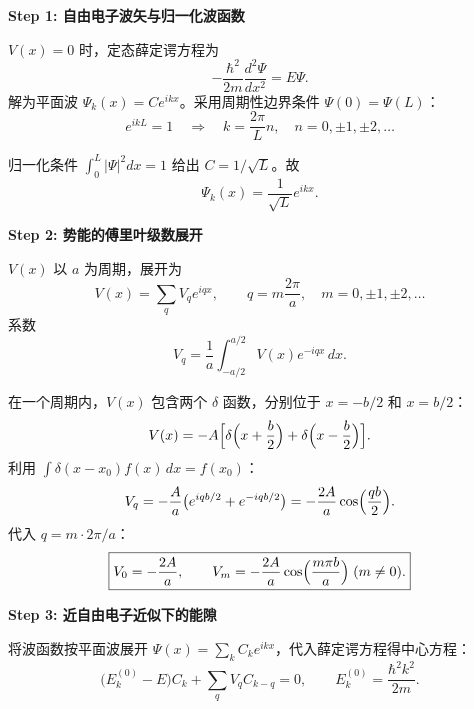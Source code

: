 \begin{derivationbox}[标准解题过程]
\textbf{Step 1: 自由电子波矢与归一化波函数}

$V(x)=0$ 时，定态薛定谔方程为
\begin{equation}
-\frac{\hbar^2}{2m}\frac{d^2\Psi}{dx^2}=E\Psi.
\end{equation}
解为平面波 $\Psi_k(x)=Ce^{ikx}$。采用周期性边界条件 $\Psi(0)=\Psi(L)$：
\begin{equation}
e^{ikL}=1\quad\Longrightarrow\quad k=\frac{2\pi}{L}n,\quad n=0,\pm1,\pm2,\ldots
\end{equation}

归一化条件 $\int_0^L|\Psi|^2dx=1$ 给出 $C=1/\sqrt{L}$。故
\begin{equation}
\boxed{\Psi_k(x)=\frac{1}{\sqrt{L}}e^{ikx}.}
\end{equation}

\textbf{Step 2: 势能的傅里叶级数展开}

$V(x)$ 以 $a$ 为周期，展开为
\begin{equation}
V(x)=\sum_{q}V_q e^{iqx},\qquad q=m\frac{2\pi}{a},\quad m=0,\pm1,\pm2,\ldots
\end{equation}
系数
\begin{equation}
V_q=\frac{1}{a}\int_{-a/2}^{a/2}V(x)e^{-iqx}\,dx.
\end{equation}

在一个周期内，$V(x)$ 包含两个 $\delta$ 函数，分别位于 $x=-b/2$ 和 $x=b/2$：
\begin{equation}
V(x)=-A\Bigl[\delta\Bigl(x+\frac{b}{2}\Bigr)+\delta\Bigl(x-\frac{b}{2}\Bigr)\Bigr].
\end{equation}
利用 $\int\delta(x-x_0)f(x)\,dx=f(x_0)$：
\begin{equation}
V_q=-\frac{A}{a}\bigl(e^{iqb/2}+e^{-iqb/2}\bigr)=-\frac{2A}{a}\cos\Bigl(\frac{qb}{2}\Bigr).
\end{equation}
代入 $q=m\cdot2\pi/a$：
\begin{equation}
\boxed{V_0=-\frac{2A}{a},\qquad V_m=-\frac{2A}{a}\cos\Bigl(\frac{m\pi b}{a}\Bigr)\;(m\neq0).}
\end{equation}

\textbf{Step 3: 近自由电子近似下的能隙}

将波函数按平面波展开 $\Psi(x)=\sum_k C_k e^{ikx}$，代入薛定谔方程得中心方程：
\begin{equation}
\bigl(E_k^{(0)}-E\bigr)C_k+\sum_q V_q C_{k-q}=0,\qquad E_k^{(0)}=\frac{\hbar^2k^2}{2m}.
\end{equation}


\end{derivationbox}

